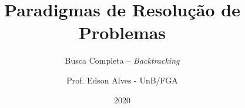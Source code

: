 \title{Paradigmas de Resolução de Problemas}
\subtitle{Busca Completa -- {\it Backtracking}}
\author{Prof. Edson Alves - UnB/FGA}
\date{2020}
